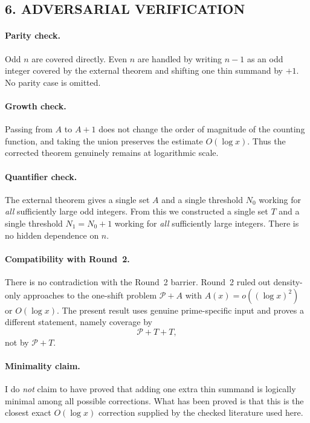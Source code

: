 \subsection{6. ADVERSARIAL VERIFICATION}

\paragraph{Parity check.}
Odd $n$ are covered directly.  Even $n$ are handled by writing $n-1$ as an odd integer covered by the external theorem and shifting one thin summand by $+1$.  No parity case is omitted.

\paragraph{Growth check.}
Passing from $A$ to $A+1$ does not change the order of magnitude of the counting function, and taking the union preserves the estimate $O(\log x)$.  Thus the corrected theorem genuinely remains at logarithmic scale.

\paragraph{Quantifier check.}
The external theorem gives a single set $A$ and a single threshold $N_0$ working for \emph{all} sufficiently large odd integers.  From this we constructed a single set $T$ and a single threshold $N_1=N_0+1$ working for \emph{all} sufficiently large integers.  There is no hidden dependence on $n$.

\paragraph{Compatibility with Round~2.}
There is no contradiction with the Round~2 barrier.  Round~2 ruled out density-only approaches to the one-shift problem $\mathcal P+A$ with $A(x)=o((\log x)^2)$ or $O(\log x)$.  The present result uses genuine prime-specific input and proves a different statement, namely coverage by
\[
\mathcal P+T+T,
\]
not by $\mathcal P+T$.

\paragraph{Minimality claim.}
I do \emph{not} claim to have proved that adding one extra thin summand is logically minimal among all possible corrections.  What has been proved is that this is the closest exact $O(\log x)$ correction supplied by the checked literature used here.

